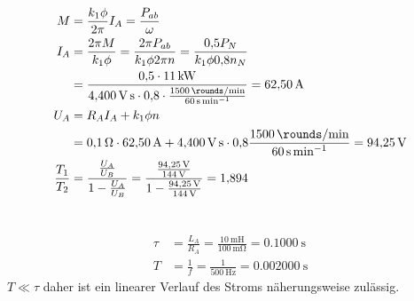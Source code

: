 \documentclass[11pt,a4paper]{scrartcl}
\newcommand{\0}{_{\mybr{0}}}
\newcommand{\1}{_{\mybr{1}}}
\newcommand{\2}{_{\mybr{2}}}
\begin{document}
\section{}
\begin{align}
M&=\frac{k_1\phi}{2\pi}I_A=\frac{P_{ab}}{\omega}\\
I_A&=\frac{2\pi M}{k_1\phi}=\frac{2\pi P_{ab}}{k_1\phi 2\pi n}=\frac{\num{0.5}P_N}{k_1\phi\num{0.8}n_N}\\
&=\frac{\num{0.5}\cdot\SI{11}{\kilo\watt}}{\SI{4.400}{\volt\second}\cdot\num{0.8}\cdot\frac{\SI{1500}{\rounds\per\minute}}{\SI{60}{\second\per\minute}}}=\SI{62.50}{\ampere}\\
U_A&=R_A I_A+k_1\phi n\\
&=\SI{0.1}{\ohm}\cdot\SI{62.50}{\ampere}+\SI{4.400}{\volt\second}\cdot\num{0.8}\frac{\SI{1500}{\rounds\per\minute}}{\SI{60}{\second\per\minute}}=\SI{94.25}{\volt}\\
\frac{T_1}{T_2}&=\frac{\frac{U_A}{U_B}}{1-\frac{U_A}{U_B}}=\frac{\frac{\SI{94.25}{\volt}}{\SI{144}{\volt}}}{1-\frac{\SI{94.25}{\volt}}{\SI{144}{\volt}}}=\num{1.894}
\end{align}

\section{}
\begin{align}
\tau&=\frac{L_A}{R_A}=\frac{\SI{10}{\milli\henry}}{\SI{100}{\milli\ohm}}=\SI{0.1000}{\second}\\
T&=\frac{1}{f}=\frac{1}{\SI{500}{\hertz}}=\SI{0.002000}{\second}
\end{align}
$T\ll\tau$ daher ist ein linearer Verlauf des Stroms näherungsweise zulässig.
\end{document}
